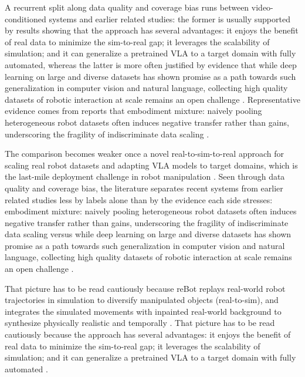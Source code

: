 \documentclass[a4paper,11pt]{article}
\begin{document}
A recurrent split along data quality and coverage bias runs between video-conditioned systems and earlier related studies: the former is usually supported by results showing that the approach has several advantages: it enjoys the benefit of real data to minimize the sim-to-real gap; it leverages the scalability of simulation; and it can generalize a pretrained VLA to a target domain with fully automated, whereas the latter is more often justified by evidence that while deep learning on large and diverse datasets has shown promise as a path towards such generalization in computer vision and natural language, collecting high quality datasets of robotic interaction at scale remains an open challenge \citep{Fang2025Rebot,Chen2021Learning,Yu2023Scaling}. Representative evidence comes from reports that embodiment mixture: naively pooling heterogeneous robot datasets often induces negative transfer rather than gains, underscoring the fragility of indiscriminate data scaling \citep{Wang2026Rethinking}.

The comparison becomes weaker once a novel real-to-sim-to-real approach for scaling real robot datasets and adapting VLA models to target domains, which is the last-mile deployment challenge in robot manipulation \citep{Fang2025Rebot}. Seen through data quality and coverage bias, the literature separates recent systems from earlier related studies less by labels alone than by the evidence each side stresses: embodiment mixture: naively pooling heterogeneous robot datasets often induces negative transfer rather than gains, underscoring the fragility of indiscriminate data scaling versus while deep learning on large and diverse datasets has shown promise as a path towards such generalization in computer vision and natural language, collecting high quality datasets of robotic interaction at scale remains an open challenge \citep{Wang2026Rethinking,Luo2026Being,Chen2021Learning,Yu2023Scaling}.

That picture has to be read cautiously because reBot replays real-world robot trajectories in simulation to diversify manipulated objects (real-to-sim), and integrates the simulated movements with inpainted real-world background to synthesize physically realistic and temporally \citep{Fang2025Rebot}. That picture has to be read cautiously because the approach has several advantages: it enjoys the benefit of real data to minimize the sim-to-real gap; it leverages the scalability of simulation; and it can generalize a pretrained VLA to a target domain with fully automated \citep{Fang2025Rebot}.
\end{document}
